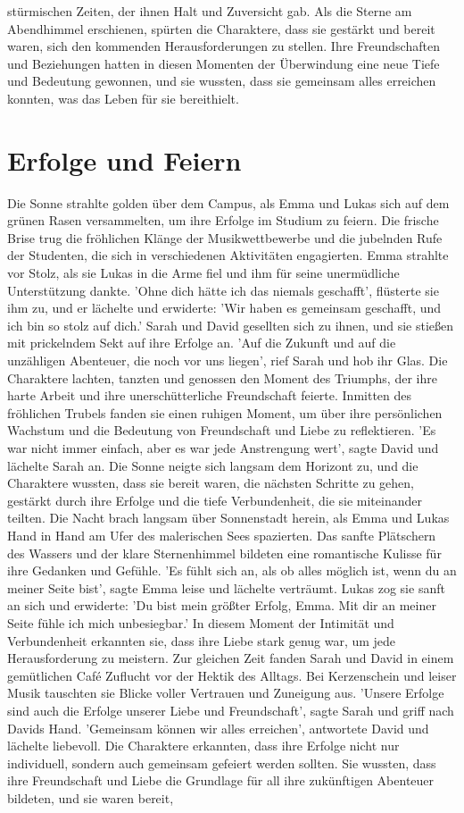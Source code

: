 \documentclass[12pt]{article} %
\begin{document}
stürmischen Zeiten, der ihnen Halt und Zuversicht gab. Als die Sterne am Abendhimmel erschienen, spürten die Charaktere, dass sie gestärkt und bereit waren, sich den kommenden Herausforderungen zu stellen. Ihre Freundschaften und Beziehungen hatten in diesen Momenten der Überwindung eine neue Tiefe und Bedeutung gewonnen, und sie wussten, dass sie gemeinsam alles erreichen konnten, was das Leben für sie bereithielt.

\section{ Erfolge und Feiern }
 Die Sonne strahlte golden über dem Campus, als Emma und Lukas sich auf dem grünen Rasen versammelten, um ihre Erfolge im Studium zu feiern. Die frische Brise trug die fröhlichen Klänge der Musikwettbewerbe und die jubelnden Rufe der Studenten, die sich in verschiedenen Aktivitäten engagierten. Emma strahlte vor Stolz, als sie Lukas in die Arme fiel und ihm für seine unermüdliche Unterstützung dankte. 'Ohne dich hätte ich das niemals geschafft', flüsterte sie ihm zu, und er lächelte und erwiderte: 'Wir haben es gemeinsam geschafft, und ich bin so stolz auf dich.' Sarah und David gesellten sich zu ihnen, und sie stießen mit prickelndem Sekt auf ihre Erfolge an. 'Auf die Zukunft und auf die unzähligen Abenteuer, die noch vor uns liegen', rief Sarah und hob ihr Glas. Die Charaktere lachten, tanzten und genossen den Moment des Triumphs, der ihre harte Arbeit und ihre unerschütterliche Freundschaft feierte. Inmitten des fröhlichen Trubels fanden sie einen ruhigen Moment, um über ihre persönlichen Wachstum und die Bedeutung von Freundschaft und Liebe zu reflektieren. 'Es war nicht immer einfach, aber es war jede Anstrengung wert', sagte David und lächelte Sarah an. Die Sonne neigte sich langsam dem Horizont zu, und die Charaktere wussten, dass sie bereit waren, die nächsten Schritte zu gehen, gestärkt durch ihre Erfolge und die tiefe Verbundenheit, die sie miteinander teilten. Die Nacht brach langsam über Sonnenstadt herein, als Emma und Lukas Hand in Hand am Ufer des malerischen Sees spazierten. Das sanfte Plätschern des Wassers und der klare Sternenhimmel bildeten eine romantische Kulisse für ihre Gedanken und Gefühle. 'Es fühlt sich an, als ob alles möglich ist, wenn du an meiner Seite bist', sagte Emma leise und lächelte verträumt. Lukas zog sie sanft an sich und erwiderte: 'Du bist mein größter Erfolg, Emma. Mit dir an meiner Seite fühle ich mich unbesiegbar.' In diesem Moment der Intimität und Verbundenheit erkannten sie, dass ihre Liebe stark genug war, um jede Herausforderung zu meistern. Zur gleichen Zeit fanden Sarah und David in einem gemütlichen Café Zuflucht vor der Hektik des Alltags. Bei Kerzenschein und leiser Musik tauschten sie Blicke voller Vertrauen und Zuneigung aus. 'Unsere Erfolge sind auch die Erfolge unserer Liebe und Freundschaft', sagte Sarah und griff nach Davids Hand. 'Gemeinsam können wir alles erreichen', antwortete David und lächelte liebevoll. Die Charaktere erkannten, dass ihre Erfolge nicht nur individuell, sondern auch gemeinsam gefeiert werden sollten. Sie wussten, dass ihre Freundschaft und Liebe die Grundlage für all ihre zukünftigen Abenteuer bildeten, und sie waren bereit, 
\end{document}
